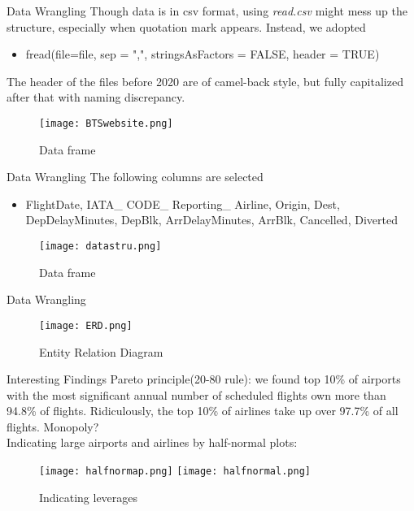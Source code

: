 \documentclass[11pt]{beamer}
\begin{document}
\begin{frame}{Data Wrangling}
Though data is in csv format, using {\it read.csv} might mess up the structure, especially when quotation mark appears.  Instead, we adopted \\
\begin{itemize}
\small
\item fread(file=file, sep = ",", stringsAsFactors = FALSE, header = TRUE) 
\end{itemize}
The header of the files before 2020 are of camel-back style, but fully capitalized after that with naming discrepancy.  
\begin{figure}
\texttt{[image: BTSwebsite.png]} 
\small
\caption{Data frame}
\end{figure}
\end{frame}

\begin{frame}{Data Wrangling}
The following columns are selected \\
\begin{itemize}
\small
\item FlightDate,  IATA\_ CODE\_ Reporting\_ Airline, Origin, Dest, DepDelayMinutes, DepBlk, ArrDelayMinutes, ArrBlk, Cancelled,  Diverted
\end{itemize}
\begin{figure}
\texttt{[image: datastru.png]} 
\small
\caption{Data frame}
\end{figure}
\end{frame}

\begin{frame}{Data Wrangling}
\begin{figure}
\texttt{[image: ERD.png]} 
\small
\caption{Entity Relation Diagram}
\end{figure}
\end{frame}

\begin{frame}{Interesting Findings}
Pareto principle(20-80 rule): we found top 10\% of airports with the most significant annual number of scheduled flights own more than 94.8\% of flights. Ridiculously, the top 10\% of airlines take up over 97.7\% of all flights.  Monopoly?\\
Indicating large airports and airlines by half-normal plots:\\
\center
\begin{figure}
\texttt{[image: halfnormap.png]} 
\texttt{[image: halfnormal.png]} 
\small
\caption{Indicating leverages}
\end{figure}
\end{frame}
\end{document}
